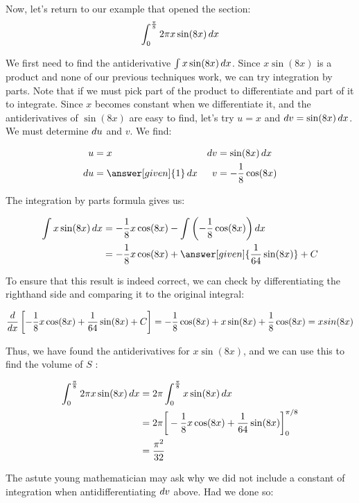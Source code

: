 \documentclass{ximera}
\begin{document}
\begin{example}
Now, let's return to our example that opened the section:
\[
\int_{0}^{\frac{\pi}{8}} 2 \pi x\sin(8x) \mathop{}\!d x
\]

\begin{explanation}
We first need to find the antiderivative $\int x\sin(8x) \mathop{}\!d x$.  Since $x\sin(8x)$ is a product and none of our previous techniques work, we can try integration by parts.  Note that if we must pick part of the product to differentiate and part of it to integrate.  Since $x$ becomes constant when we differentiate it, and the antiderivatives of $\sin(8x)$ are easy to find, let's try $u=x$ and $\mathop{}\!d v=\sin(8x) \mathop{}\!d x$.  
We must determine $\mathop{}\!d u$ and  $v$. We find:

\begin{align*}
u &= x & \d v & = \sin(8x) \d x \\
 \d u &= \answer[given]{1} \d x & v&=-\frac{1}{8}\cos(8x)
\end{align*}

The integration by parts formula gives us:

\begin{align*}
\int x\sin(8x) \d x &=-\frac{1}{8}x\cos(8x) -\int \left(-\frac{1}{8}\cos(8x)\right) \d x \\
&=-\frac{1}{8}x\cos(8x) + \answer[given]{\frac{1}{64}\sin(8x)} +C 
\end{align*}

To ensure that this result is indeed correct, we can check by differentiating the righthand side and comparing it to the original integral:

\[
\frac{d}{\mathop{}\!d x}\left[-\frac{1}{8}x\cos(8x) +\frac{1}{64}\sin(8x) +C \right] = -\frac{1}{8} \cos(8x) +x \sin(8x) +\frac{1}{8} \cos(8x) = x sin(8x)
\]

Thus, we have found the antiderivatives for $x\sin(8x)$, and we can use this to find the volume of $S$ :

\begin{align*}
\int_{0}^{\frac{\pi}{8}} 2 \pi x\sin(8x) \mathop{}\!d x &= 2 \pi \int_{0}^{\frac{\pi}{8}} x\sin(8x) \mathop{}\!d x \\
&= 2 \pi \bigg[  -\frac{1}{8}x\cos(8x) + \frac{1}{64}\sin(8x) \bigg]_0^{\pi/8}\\
&=\frac{\pi^{2}}{32}
\end{align*}

\begin{remark}
The astute young mathematician may ask why we did not include a constant of integration when antidifferentiating $\mathop{}\!d v$ above.  Had we done so:


\end{remark}
\end{explanation}
\end{example}
\end{document}
